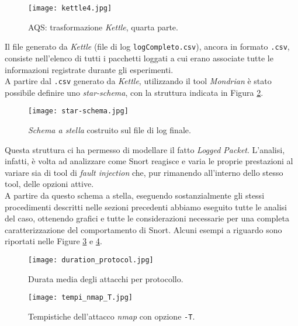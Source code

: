 	    \begin{figure}[h!]
			\centering
			\texttt{[image: kettle4.jpg]}
			\caption{AQS: trasformazione \textit{Kettle}, quarta parte.}
			\label{fig:kettle4}
		\end{figure}
	
		Il file generato da \textit{Kettle} (file di log \texttt{logCompleto.csv}), ancora in formato \texttt{.csv}, consiste nell'elenco di tutti i pacchetti loggati a cui erano associate tutte le informazioni registrate durante gli esperimenti.\\
		A partire dal \texttt{.csv} generato da \textit{Kettle}, utilizzando il tool \textit{Mondrian} è stato possibile definire uno \textit{star-schema}, con la struttura indicata in Figura \ref{fig:star}.
		
		\begin{figure}[h!]
			\centering
			\texttt{[image: star-schema.jpg]}
			\caption{\textit{Schema a stella} costruito sul file di log finale.}
			\label{fig:star}
		\end{figure}
		
		Questa struttura ci ha permesso di modellare il fatto \textit{Logged Packet}. L'analisi, infatti, è volta ad analizzare come Snort reagisce e varia le proprie prestazioni al variare sia di tool di \textit{fault injection} che, pur rimanendo all'interno dello stesso tool, delle opzioni attive.\\
		A partire da questo schema a stella, eseguendo sostanzialmente gli stessi procedimenti descritti nelle sezioni precedenti abbiamo eseguito tutte le analisi del caso, ottenendo grafici e tutte le considerazioni necessarie per una completa caratterizzazione del comportamento di Snort. Alcuni esempi a riguardo sono riportati nelle Figure \ref{fig:duration_protocol} e \ref{fig:tempi_nmap_T}.
		
		\begin{figure}[h!]
			\centering
			\texttt{[image: duration\_protocol.jpg]}
			\caption{Durata media degli attacchi per protocollo.}
			\label{fig:duration_protocol}
		\end{figure}
		
		\begin{figure}[h!]
			\centering
			\texttt{[image: tempi\_nmap\_T.jpg]}
			\caption{Tempistiche dell'attacco \textit{nmap} con opzione \texttt{-T}.}
			\label{fig:tempi_nmap_T}
		\end{figure}
